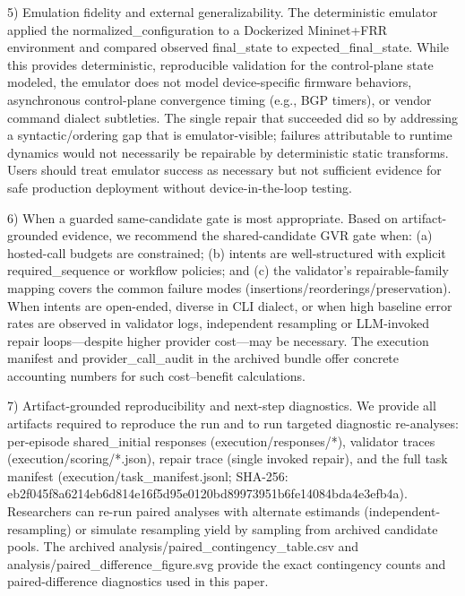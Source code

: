 \documentclass[conference]{IEEEtran}
\begin{document}
5) Emulation fidelity and external generalizability. The deterministic emulator applied the normalized\_configuration to a Dockerized Mininet+FRR environment and compared observed final\_state to expected\_final\_state. While this provides deterministic, reproducible validation for the control-plane state modeled, the emulator does not model device-specific firmware behaviors, asynchronous control-plane convergence timing (e.g., BGP timers), or vendor command dialect subtleties. The single repair that succeeded did so by addressing a syntactic/ordering gap that is emulator-visible; failures attributable to runtime dynamics would not necessarily be repairable by deterministic static transforms. Users should treat emulator success as necessary but not sufficient evidence for safe production deployment without device-in-the-loop testing.

6) When a guarded same-candidate gate is most appropriate. Based on artifact-grounded evidence, we recommend the shared-candidate GVR gate when: (a) hosted-call budgets are constrained; (b) intents are well-structured with explicit required\_sequence or workflow policies; and (c) the validator's repairable-family mapping covers the common failure modes (insertions/reorderings/preservation). When intents are open-ended, diverse in CLI dialect, or when high baseline error rates are observed in validator logs, independent resampling or LLM-invoked repair loops---despite higher provider cost---may be necessary. The execution manifest and provider\_call\_audit in the archived bundle offer concrete accounting numbers for such cost--benefit calculations.

7) Artifact-grounded reproducibility and next-step diagnostics. We provide all artifacts required to reproduce the run and to run targeted diagnostic re-analyses: per-episode shared\_initial responses (execution/responses/*), validator traces (execution/scoring/*.json), repair trace (single invoked repair), and the full task manifest (execution/task\_manifest.jsonl; SHA-256: eb2f045f\allowbreak{}8a6214eb\allowbreak{}6d814e16\allowbreak{}f5d95e01\allowbreak{}20bd8997\allowbreak{}3951b6fe\allowbreak{}14084bda\allowbreak{}4e3efb4a). Researchers can re-run paired analyses with alternate estimands (independent-resampling) or simulate resampling yield by sampling from archived candidate pools. The archived analysis/paired\_contingency\_table.csv and analysis/paired\_difference\_figure.svg provide the exact contingency counts and paired-difference diagnostics used in this paper.
\end{document}
